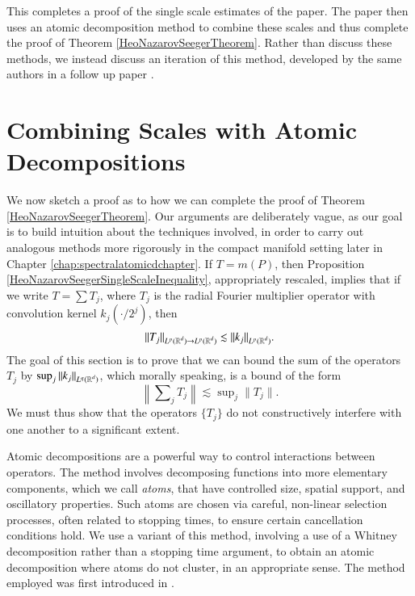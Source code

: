 This completes a proof of the single scale estimates of the paper. The paper then uses an atomic decomposition method to combine these scales and thus complete the proof of Theorem \ref{HeoNazarovSeegerTheorem}. Rather than discuss these methods, we instead discuss an iteration of this method, developed by the same authors in a follow up paper \cite{HeoandNazarovandSeeger2}.

\section{Combining Scales with Atomic Decompositions} \label{sec:combiningscaleswithatomicdecompositions}

We now sketch a proof as to how we can complete the proof of Theorem \ref{HeoNazarovSeegerTheorem}. Our arguments are deliberately vague, as our goal is to build intuition about the techniques involved, in order to carry out analogous methods more rigorously in the compact manifold setting later in Chapter \ref{chap:spectralatomicdchapter}. If $T = m(P)$, then Proposition \ref{HeoNazarovSeegerSingleScaleInequality}, appropriately rescaled, implies that if we write $T = \sum T_j$, where $T_j$ is the radial Fourier multiplier operator with convolution kernel $k_j(\cdot/2^j)$, then
%
\begin{equation} \label{individualscaleoperatorbound}
    \| T_j \|_{L^p(\operatorname{\mathbb{R}}^d) \to L^p(\operatorname{\mathbb{R}}^d)} \lesssim \| k_j \|_{L^p(\operatorname{\mathbb{R}}^d)}.
\end{equation}
%
The goal of this section is to prove that we can bound the sum of the operators $T_j$ by $\sup_j \| k_j \|_{L^q(\operatorname{\mathbb{R}}^d)}$, which morally speaking, is a bound of the form
%
\begin{equation}
  \left\| \sum\nolimits_j T_j \right\| \lesssim \sup\nolimits_j \| T_j \|.
\end{equation}
%
We must thus show that the operators $\{ T_j \}$ do not constructively interfere with one another to a significant extent.

Atomic decompositions are a powerful way to control interactions between operators. The method involves decomposing functions into more elementary components, which we call \emph{atoms}, that have controlled size, spatial support, and oscillatory properties. Such atoms are chosen via careful, non-linear selection processes, often related to stopping times, to ensure certain cancellation conditions hold. We use a variant of this method, involving a use of a Whitney decomposition rather than a stopping time argument, to obtain an atomic decomposition where atoms do not cluster, in an appropriate sense. The method employed was first introduced in \cite{SeegerRemarks}.

